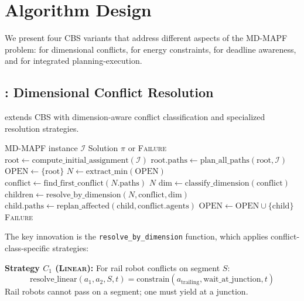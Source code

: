 \section{Algorithm Design}
\label{sec:algorithms}

We present four CBS variants that address different aspects of the MD-MAPF problem: \mixedcbs{} for dimensional conflicts, \ecbs{} for energy constraints, \deadline{} for deadline awareness, and \hybridcbs{} for integrated planning-execution.

\subsection{\mixedcbs{}: Dimensional Conflict Resolution}

\mixedcbs{} extends CBS with dimension-aware conflict classification and specialized resolution strategies.

\begin{algorithm}
\caption{\mixedcbs{} Algorithm}
\label{alg:mixedcbs}
\begin{algorithmic}[1]
\REQUIRE MD-MAPF instance $\mathcal{I}$
\ENSURE Solution $\pi$ or \textsc{Failure}
\STATE $\text{root} \leftarrow \text{compute\_initial\_assignment}(\mathcal{I})$
\STATE $\text{root.paths} \leftarrow \text{plan\_all\_paths}(\text{root}, \mathcal{I})$
\STATE $\text{OPEN} \leftarrow \{\text{root}\}$
    \STATE $N \leftarrow \text{extract\_min}(\text{OPEN})$
    \STATE $\text{conflict} \leftarrow \text{find\_first\_conflict}(N.\text{paths})$
        \RETURN $N$ 
    \ENDIF
    \STATE $\text{dim} \leftarrow \text{classify\_dimension}(\text{conflict})$
    \STATE $\text{children} \leftarrow \text{resolve\_by\_dimension}(N, \text{conflict}, \text{dim})$
        \STATE $\text{child.paths} \leftarrow \text{replan\_affected}(\text{child}, \text{conflict.agents})$
            \STATE $\text{OPEN} \leftarrow \text{OPEN} \cup \{\text{child}\}$
        \ENDIF
    \ENDFOR
\ENDWHILE
\RETURN \textsc{Failure}
\end{algorithmic}
\end{algorithm}

The key innovation is the \texttt{resolve\_by\_dimension} function, which applies conflict-class-specific strategies:

\textbf{Strategy $C_1$ (\textsc{Linear}):} For rail robot conflicts on segment $S$:
\begin{equation}
\text{resolve\_linear}(a_1, a_2, S, t) = \text{constrain}(a_{\text{trailing}}, \text{wait\_at\_junction}, t)
\end{equation}
Rail robots cannot pass on a segment; one must yield at a junction.

